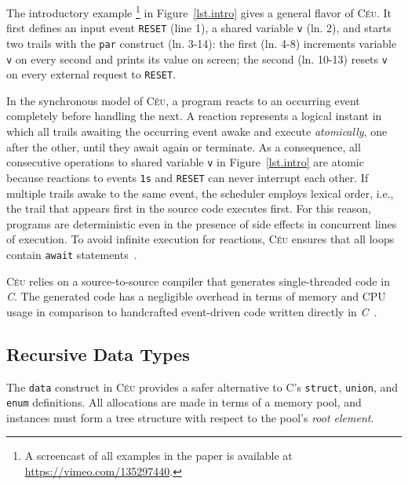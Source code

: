 \documentclass{sig-alternate}
\newcommand{\CEU}{\textsc{C\'{e}u}\xspace}
\newcommand{\code}[1] {{\small{\texttt{#1}}}}
\begin{document}

The introductory example%
\footnote{A screencast of all examples in the paper is available at 
\url{https://vimeo.com/135297440}.}
in Figure~\ref{lst.intro} gives a general flavor of \CEU.
It first defines an input event \code{RESET} (line 1), a shared variable 
\code{v} (ln. 2), and starts two trails with the \code{par} construct (ln. 
3-14): the first (ln. 4-8) increments variable \code{v} on every second and 
prints its value on screen; the second (ln. 10-13) resets \code{v} on every 
external request to \code{RESET}.

In the synchronous model of \CEU, a program reacts to an occurring event 
completely before handling the next.
%
A reaction represents a logical instant in which all trails awaiting the 
occurring event awake and execute \emph{atomically}, one after the other, until 
they await again or terminate.
%
As a consequence, all consecutive operations to shared variable \code{v} in 
Figure~\ref{lst.intro} are atomic because reactions to events \code{1s} and 
\code{RESET} can never interrupt each other.
%
If multiple trails awake to the same event, the scheduler employs lexical 
order, i.e., the trail that appears first in the source code executes first.
%
For this reason, programs are deterministic even in the presence of side 
effects in concurrent lines of execution.
%
To avoid infinite execution for reactions, \CEU ensures that all loops contain 
\code{await} statements~\cite{ceu.sensys13}.

\CEU relies on a source-to-source compiler that generates single-threaded code 
in \emph{C}.
The generated code has a negligible overhead in terms of memory and CPU usage 
in comparison to handcrafted event-driven code written directly in 
\emph{C}~\cite{ceu.sensys13}.

\subsection{Recursive Data Types}

The \code{data} construct in \CEU provides a safer alternative to C's
\code{struct}, \code{union}, and \code{enum} definitions.
All allocations are made in terms of a memory pool, and instances
must form a tree structure with respect to the pool's \emph{root element}.
\end{document}
